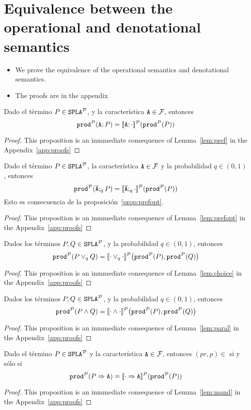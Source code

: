 \section{Equivalence between the operational and denotational semantics}\label{sec:equivalence}

\begin{itemize}
\item We prove the equivalence of the operational semantics and
  denotational semantics.
\item The proofs are in the appendix
\end{itemize}

\bprop\label{prop:pref}
  Dado el término $P\in\fodaPAp$, y la característica $\feature{A}\in\calF$, entonces
  $$\prodp(\feature{A};P)=\semdenp{\feature{A};\cdot}(\prodp(P))$$
\begin{proof}
  This proposition is an inmmediate consequence of
  Lemma~\ref{lem:pref} in the Appendix~\ref{app:proofs}
\end{proof}
\eprop


\bprop\label{prop:prefopt}
  Dado el término $P\in\fodaPAp$, la característica $\feature{A}\in\calF$ y la probabilidad $q\in (0,1)$, entonces
  $$\prodp(\ofeature{A};_qP)=\semdenp{\ofeature{A};_q\cdot}(\prodp(P))$$
  \bprf
    Esto es consecuencia de la proposición~\ref{prop:prefopt}.
  \eprf
\begin{proof}
  This proposition is an inmmediate consequence of
  Lemma~\ref{lem:prefopt} in the Appendix~\ref{app:proofs}
\end{proof}
\eprop


\bprop\label{prop:choice}
  Dados los términos $P,Q\in\fodaPAp$, y la probabilidad $q\in (0,1)$, entonces
  $$\prodp(P\choice_q Q)=\semdenp{\cdot\choice_q\cdot}\bigl(\prodp(P),\prodp(Q)\bigr)$$
\begin{proof}
  This proposition is an inmmediate consequence of
  Lemma~\ref{lem:choice} in the Appendix~\ref{app:proofs}
\end{proof}
\eprop


\bprop\label{prop:paral}
  Dados los términos $P,Q\in\fodaPAp$, y la probabilidad $q\in (0,1)$, entonces
  $$\prodp(P\paral Q)=\semdenp{\cdot\paral\cdot}\bigl(\prodp(P),\prodp(Q)\bigr)$$
\begin{proof}
  This proposition is an inmmediate consequence of
  Lemma~\ref{lem:paral} in the Appendix~\ref{app:proofs}
\end{proof}
\eprop

\bprop\label{prop:mand}
  Dado el término   $P\in\fodaPAp$  y la característica  $\feature{A}\in\calF$, entonces $(pr,p)\in$ si y sólo si
  $$\prodp(\mandatory{A}{P})=\semdenp{\mandatory{A}{\cdot}}(\prodp(P))$$
\begin{proof}
  This proposition is an inmmediate consequence of
  Lemma~\ref{lem:mand} in the Appendix~\ref{app:proofs}
\end{proof}
\eprop

